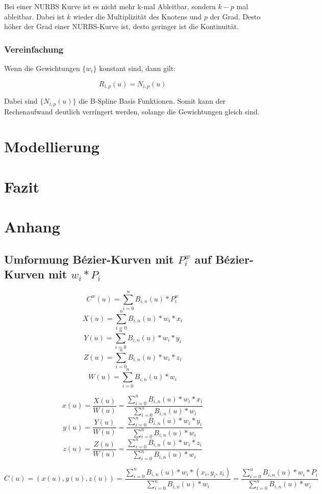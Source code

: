 \documentclass[11pt]{article}
\begin{document}
Bei einer NURBS Kurve ist es nicht mehr k-mal Ableitbar,  sondern $k-p$ mal ableitbar. 
Dabei ist $k$ wieder die Multiplizität des Knotens und $p$ der Grad.
Desto höher der Grad einer NURBS-Kurve ist, desto geringer ist die Kontinuität. 

\subsubsection*{Vereinfachung}
Wenn die Gewichtungen $\{w_{i}\}$ konstant sind, dann gilt:

\begin{equation}
R_{i,p}(u) = N_{i,p}(u)
\end{equation}

Dabei sind $\{N_{i,p}(u)\}$ die B-Spline Basis Funktionen. 
Somit kann der Rechenaufwand deutlich verringert werden, solange die Gewichtungen gleich sind.



\section{Modellierung}
\label{sec:modellierung}

\section{Fazit}
\label{sec:fazit}
\section{Anhang}
\subsection*{Umformung Bézier-Kurven mit $P_{i}^{w}$ auf Bézier-Kurven mit $w_{i}*P_{i}$}
\[C^{w}(u) = \sum_{i=0}^{n} B_{i,n} (u) * P^{w}_{i}\]
\[X(u) = \sum_{i=0}^{n} B_{i,n} (u) * w_{i} * x_{i}\]
\[Y(u) = \sum_{i=0}^{n} B_{i,n} (u) * w_{i} * y_{i}\]
\[Z(u) = \sum_{i=0}^{n} B_{i,n} (u) * w_{i} * z_{i}\]
\[W(u) = \sum_{i=0}^{n} B_{i,n} (u) * w_{i}\]

\[x(u) = \frac{X(u)}{W(u)} = \frac{\sum_{i=0}^{n} B_{i,n} (u) * w_{i} * x_{i}}{ \sum_{i=0}^{n} B_{i,n} (u) * w_{i}}\] 
\[y(u) = \frac{Y(u)}{W(u)} = \frac{\sum_{i=0}^{n} B_{i,n} (u) * w_{i} * y_{i}}{ \sum_{i=0}^{n} B_{i,n} (u) * w_{i}}\] 
\[z(u) = \frac{Z(u)}{W(u)} = \frac{\sum_{i=0}^{n} B_{i,n} (u) * w_{i} * z_{i}}{ \sum_{i=0}^{n} B_{i,n} (u) * w_{i}}\] 

\[C(u) = (x(u), y(u), z(u)) = \frac{\sum_{i=0}^{n} B_{i,n}(u) * w_{i} * (x_{i}, y_{i}, z_{i})}{\sum_{i=0}^{n} B_{i,n}(u) * w_{i}} =  \frac{\sum_{i=0}^{n} B_{i,n}(u) * w_{i} * P_{i}}{\sum_{i=0}^{n} B_{i,n}(u) * w_{i}}\]
\end{document}
